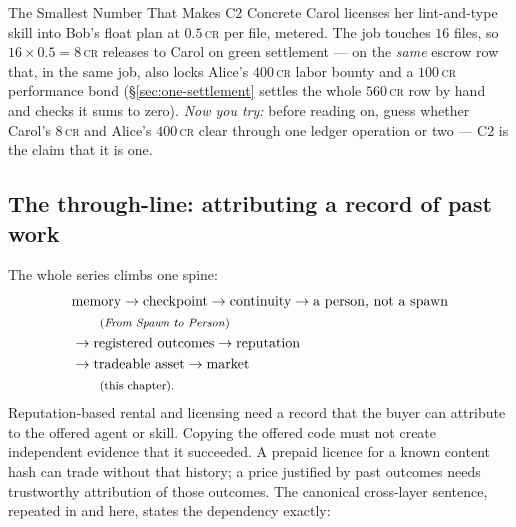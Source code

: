 \documentclass[11pt,a4paper]{article}
\theoremstyle{definition}
\theoremstyle{definition}
\theoremstyle{remark}
\begin{document}
\begin{pdexample}{The Smallest Number That Makes C2 Concrete}
\setlength{\parskip}{4pt plus 1pt}
Carol licenses her lint-and-type skill into Bob's float plan at
$0.5$\,\textsc{cr} per file, metered.
The job touches $16$ files, so
$16\times0.5=8$\,\textsc{cr} releases to Carol on green settlement --- on the
\emph{same} escrow row that, in the same job, also locks Alice's $400$\,\textsc{cr}
labor bounty and a $100$\,\textsc{cr} performance bond
(\S\ref{sec:one-settlement} settles the whole $560$\,\textsc{cr} row by hand and
checks it sums to zero).
\emph{Now you try:} before reading on, guess whether
Carol's $8$\,\textsc{cr} and Alice's $400$\,\textsc{cr} clear through one
ledger operation or two --- C2 is the claim that it is one.
\end{pdexample}
\subsection{The through-line: attributing a record of past work}
The whole series climbs one spine:
\begin{align*}
&\text{memory} \to \text{checkpoint} \to \text{continuity} \to \text{a person, not a spawn}\\
&\qquad\text{\footnotesize(\pdchapref{stp}{From Spawn to Person})}\\
&\to \text{registered outcomes} \to \text{reputation}\\
&\to \text{tradeable asset} \to \text{market}\\
&\qquad\text{\footnotesize(this chapter).}
\end{align*}
Reputation-based rental and licensing need a record that the buyer can
attribute to the offered agent or skill. Copying the offered code must not
create independent evidence that it succeeded. A prepaid licence for a known
content hash can trade without that history; a price justified by past outcomes
needs trustworthy attribution of those outcomes. The canonical
cross-layer sentence, repeated in  and
here, states the dependency
exactly:
\pdexercisepointer{\ref{ex:he-clone-word}}{\ref{ex:he-no-identity-market}}{\pageref{ex:he-clone-word}}
\end{document}
